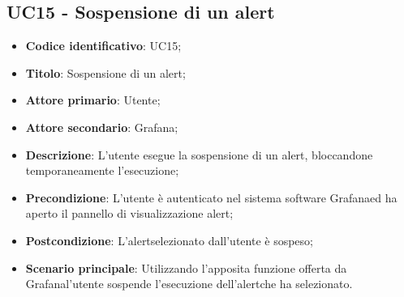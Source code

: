 \subsection{UC15 - Sospensione di un alert}
\begin{itemize}
	\item \textbf{Codice identificativo}: UC15;
	\item \textbf{Titolo}: Sospensione di un alert\glo;
	\item \textbf{Attore primario}: Utente;
	\item \textbf{Attore secondario}: Grafana\glo;
	\item \textbf{Descrizione}: L'utente esegue la sospensione di un alert\glosp, bloccandone temporaneamente l'esecuzione;
	\item \textbf{Precondizione}: L'utente è autenticato nel sistema software Grafana\glosp ed ha aperto il pannello di visualizzazione alert\glo;
	\item \textbf{Postcondizione}: L'alert\glosp selezionato dall'utente è sospeso;
	\item \textbf{Scenario principale}: Utilizzando l'apposita funzione offerta da Grafana\glosp l'utente sospende l'esecuzione dell'alert\glosp che ha selezionato.
\end{itemize} 

